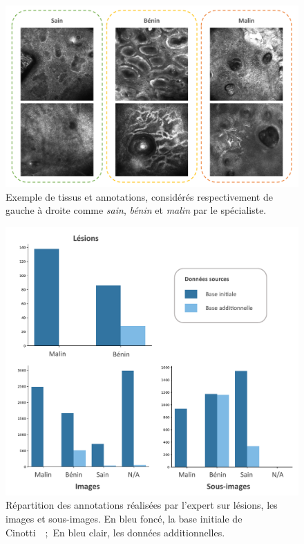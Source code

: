 \begin{figure}[H]
    \begin{center}
        \includegraphics[width=0.9\linewidth]{contents/ii_preamble_microscopy/resources/example_rcm_data.pdf}
        \caption{Exemple de tissus et annotations, considérés respectivement de gauche à droite comme \textit{sain}, \textit{bénin} et \textit{malin} par le spécialiste.}
        \label{fig:example_rcm_data}
    \end{center} 
\end{figure}\par

\begin{figure}[H]
    \begin{center}
        \includegraphics[width=0.8\linewidth]{contents/ii_preamble_microscopy/resources/scheme_rcm_statistics.pdf}
        \caption{Répartition des annotations réalisées par l'expert sur lésions, les images et sous-images. En bleu foncé, la base initiale de Cinotti~\cite{Cinotti2018}~;~En bleu clair, les données additionnelles.}
        \label{fig:scheme_rcm_statistics}
    \end{center} 
\end{figure}\par

